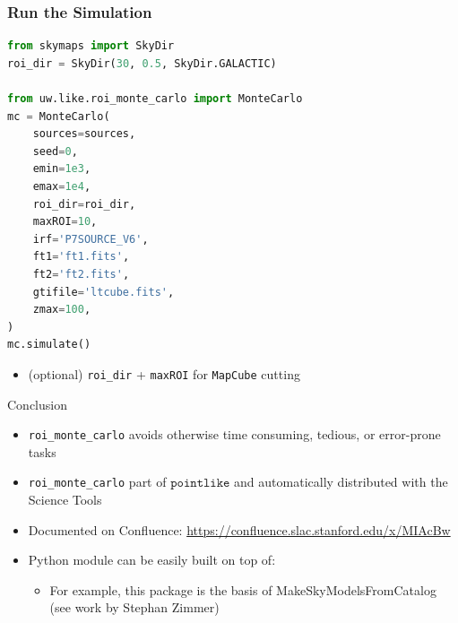 \documentclass[12pt]{beamer}
\newcommand{\pointlike}{\ensuremath{\mathtt{pointlike}}\xspace}
\newcommand{\roimc}{\texttt{roi\_monte\_carlo}\xspace}
\newcommand{\mapcube}{\texttt{MapCube}\xspace}
\begin{document}
\begin{frame}[fragile]
\frametitle{Run the Simulation}

\begin{lstlisting}[language=Python]
from skymaps import SkyDir
roi_dir = SkyDir(30, 0.5, SkyDir.GALACTIC)

from uw.like.roi_monte_carlo import MonteCarlo
mc = MonteCarlo(
    sources=sources,
    seed=0,
    emin=1e3,
    emax=1e4,
    roi_dir=roi_dir,
    maxROI=10,
    irf='P7SOURCE_V6',
    ft1='ft1.fits',
    ft2='ft2.fits',
    gtifile='ltcube.fits',
    zmax=100,
)
mc.simulate()
\end{lstlisting}

  \begin{itemize}
    \item (optional) \texttt{roi\_dir} + \texttt{maxROI} for \mapcube cutting
  \end{itemize}


\end{frame}

\begin{frame}{Conclusion}
  \begin{itemize}
    \item \roimc avoids otherwise time consuming, tedious, or error-prone tasks
    \item \roimc part of \pointlike and automatically distributed with the Science Tools
    \item Documented on Confluence:
      \url{https://confluence.slac.stanford.edu/x/MIAcBw}
    \item Python module can be easily built on top of:
      \begin{itemize}
        \item For example, this package is the basis of MakeSkyModelsFromCatalog (see work by Stephan Zimmer)
      \end{itemize}
  \end{itemize}
\end{frame}
\end{document}
